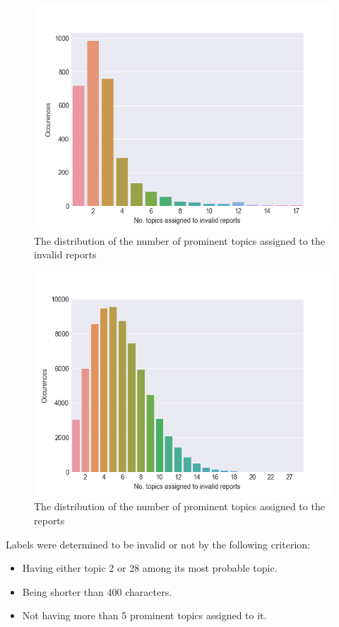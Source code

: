 \begin{figure}
    \centering
    \includegraphics[scale=0.8]{figures/no_topics_per_invalid_report}
    \caption{The distribution of the number of prominent topics assigned to the invalid reports}
    \label{fig:no_topics_invalid}
\end{figure}

\begin{figure}
    \centering
    \includegraphics[scale=0.8]{figures/no_topics_per_report}
    \caption{The distribution of the number of prominent topics assigned to the reports}
    \label{fig:no_topics_all}
\end{figure}

Labels were determined to be invalid or not by the following criterion:
\begin{itemize}
    \item Having either topic 2 or 28 among its most probable topic.
    \item Being shorter than 400 characters.
    \item Not having more than 5 prominent topics assigned to it.
\end{itemize}

